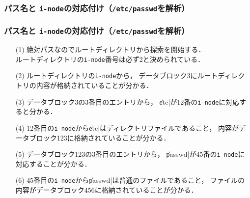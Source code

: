 \documentclass[unicode,handout]{beamer}                   %
\newcommand{\inode}{\texttt{i-node}}
\begin{document}
\begin{frame}
  \frametitle{パス名と \inode の対応付け（\texttt{/etc/passwd}を解析）}
\end{frame}

\begin{frame}[fragile]
  \frametitle{パス名と \inode の対応付け（\texttt{/etc/passwd}を解析）}
  \begin{enumerate}
  \item[(1)] 絶対パスなのでルートディレクトリから探索を開始する．\\
    ルートディレクトリの\inode 番号は必ず2と決められている．
  \item[(2)] ルートディレクトリの\inode から，
    データブロック3にルートディレクトリの内容が格納されていることが分かる．
  \item[(3)] データブロック3の3番目のエントリから，
    \|etc|が12番の\inode に対応すると分かる．
  \item[(4)] 12番目の\inode から\|etc|はディレクトリファイルであること，
    内容がデータブロック123に格納されていることが分かる．
  \item[(5)] データブロック123の3番目のエントリから，
    \|passwd|が45番の\inode に対応することが分かる．
  \item[(6)] 45番目の\inode から\|passwd|は普通のファイルであること，
    ファイルの内容がデータブロック456に格納されていることが分かる．
  \end{enumerate}
  \vfill
\end{frame}
\end{document}
